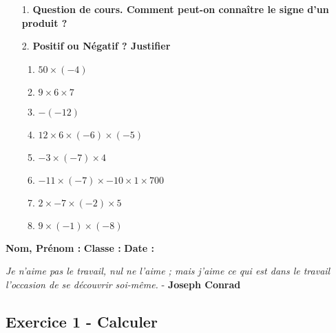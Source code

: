 \begin{enumerate}
    \item[1.] \textbf{Question de cours. Comment peut-on connaître le signe d'un produit ?} \\
    \Pointilles[3]

    \item[2.] \textbf{Positif ou Négatif ? Justifier} 
    \begin{enumerate}
        \item $50 \times (-4)$ \dotfill
        \item $9 \times 6 \times 7$ \dotfill
        \item $ -(-12)$ \dotfill
        \item $12 \times 6 \times (-6) \times (-5)$ \dotfill
        \item $-3 \times (-7) \times 4$ \dotfill
        \item $-11 \times (-7) \times -10 \times 1 \times 700$ \dotfill
        \item $2 \times -7 \times (-2) \times 5$ \dotfill
        \item $9 \times (-1) \times (-8)$ \dotfill
    \end{enumerate}
\end{enumerate}

\newpage

\textbf{Nom, Prénom :} \hspace{8cm} \textbf{Classe :} \hspace{3cm} \textbf{Date :}\\
\vspace{-0.8cm}
\begin{center}
  \textit{Je n'aime pas le travail, nul ne l'aime ; mais j'aime ce qui est dans le travail l'occasion de se découvrir soi-même.}  - \textbf{Joseph Conrad}
\end{center}
\vspace{-0.8cm}

\subsection*{Exercice 1 - Calculer}

